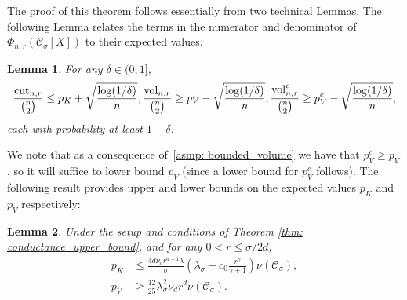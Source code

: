 \documentclass[11pt,twoside]{article}
\newtheorem{lemma}{Lemma}
\newcommand{\vol}{\mathrm{vol}}
\newcommand{\cut}{\mathrm{cut}}
\newcommand{\1}{\mathbf{1}}
\newcommand{\Xbf}{X}             %
\newcommand{\Cset}{\mathcal{C}}
\newcommand{\Csig}{\Cset_{\sigma}}
\begin{document}
The proof of this theorem follows essentially from two technical Lemmas. 
The following Lemma relates the terms in the numerator and denominator of $\Phi_{n,r}(\Csig[\Xbf])$ to their expected values.
\begin{lemma}
	\label{lem: prob_bound_cutvol}
	For any $\delta \in (0,1]$,
	\begin{equation}
	\label{eqn: numerator_additive_bound}
	\frac{\cut_{n,r}}{{n \choose 2}} \leq p_K + \sqrt{\frac{\log(1/\delta)}{n}}, \\ 
	\frac{\vol_{n,r}}{{n \choose 2}} \geq p_V - \sqrt{\frac{\log(1/\delta)}{n}}, \\
	\frac{\vol_{n,r}^c}{{n \choose 2}} \geq p_V^c - \sqrt{\frac{\log(1/\delta)}{n}},
	\end{equation}
	each with probability at least $1 - \delta$. 
\end{lemma}
We note that as a consequence of~\ref{asmp: bounded_volume} we have that $p_V^c \geq p_V$, so it will suffice to lower bound $p_V$ (since a lower bound for $p_V^c$ follows).
The 
following result provides upper and lower bounds on the expected values $p_K$ and $p_V$ respectively:
\begin{lemma}
	\label{lem: expected_density_cut}\label{lem: expected_density_volume}
	Under the setup and conditions of Theorem \ref{thm: conductance_upper_bound}, and for any $0 < r \leq \sigma/2d$,
	\begin{align}
	p_K &\leq \frac{4 d \nu_d r^{d+1} \lambda}{\sigma} \left(\lambda_{\sigma} - c_0\frac{r^{\gamma}}{\gamma + 1}\right) \nu(\Csig), \label{eqn:claim_one} \\
	p_V &\geq \frac{12}{25} \lambda_{\sigma}^2 \nu_d r^d \nu(\Csig).\label{eqn:claim_two}
	\end{align}
\end{lemma}
\end{document}
